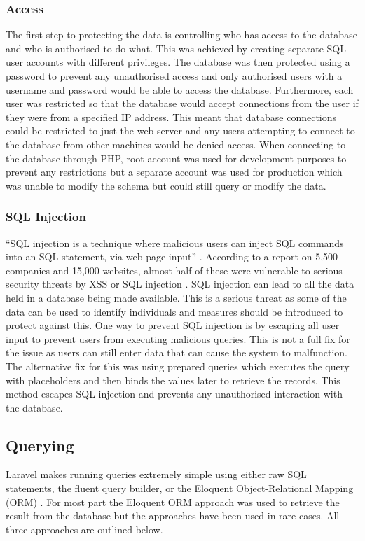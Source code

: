 \subsubsection{Access}
The first step to protecting the data is controlling who has access to the database and who is authorised to do what. This was achieved by creating separate SQL user accounts with different privileges. The database was then protected using a password to prevent any unauthorised access and only authorised users with a username and password would be able to access the database. Furthermore, each user was restricted so that the database would accept connections from the user if they were from a specified IP address. This meant that database connections could be restricted to just the web server and any users attempting to connect to the database from other machines would be denied access. When connecting to the database through PHP, root account was used for development purposes to prevent any restrictions but a separate account was used for production which was unable to modify the schema but could still query or modify the data.

\subsubsection{SQL Injection}
``SQL injection is a technique where malicious users can inject SQL commands into an SQL statement, via web page input'' \cite{W3Schools:SQL_Injection}. According to a report on 5,500 companies and 15,000 websites, almost half of these were vulnerable to serious security threats by XSS or SQL injection \cite{FirstPost:Vulnerabilities}. SQL injection can lead to all the data held in a database being made available. This is a serious threat as some of the data can be used to identify individuals and measures should be introduced to protect against this. One way to prevent SQL injection is by escaping all user input to prevent users from executing malicious queries. This is not a full fix for the issue as users can still enter data that can cause the system to malfunction. The alternative fix for this was using prepared queries which executes the query with placeholders and then binds the values later to retrieve the records. This method escapes SQL injection and prevents any unauthorised interaction with the database.

\subsection{Querying}
Laravel makes running queries extremely simple using either raw SQL statements, the fluent query builder, or the Eloquent Object-Relational Mapping (ORM) \cite{Laravel:Database}. For most part the Eloquent ORM approach was used to retrieve the result from the database but the approaches have been used in rare cases. All three approaches are outlined below.

